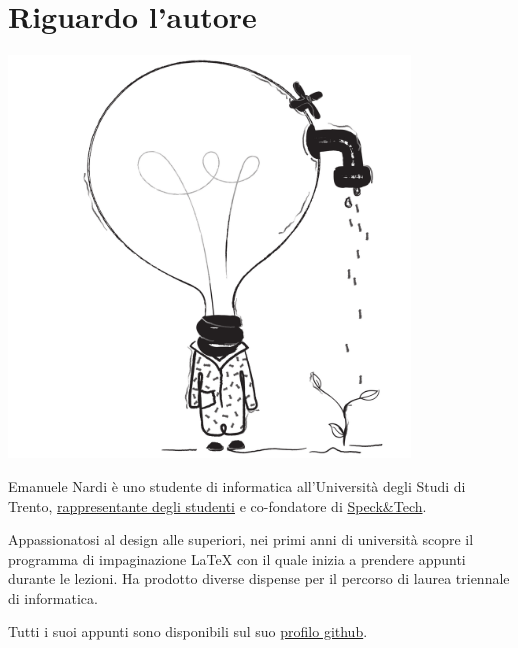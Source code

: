 \section*{Riguardo l'autore}

\begin{minipage}[c]{.5\textwidth}
\centering
	\includegraphics[width=0.8\textwidth]{assets/figures/absurd-08}
\end{minipage}
\begin{minipage}[c]{.5\textwidth}
	Emanuele Nardi è uno studente di informatica all'Università degli Studi di Trento, \href{https://www.facebook.com/rappresentantidisi/}{rappresentante degli studenti} e co-fondatore di \href{http://speckand.tech}{Speck\&Tech}.

	\medskip
	Appassionatosi al design alle superiori, nei primi anni di università scopre il programma di impaginazione {\LaTeX} con il quale inizia a prendere appunti durante le lezioni.
	Ha prodotto diverse dispense per il percorso di laurea triennale di informatica.

	\smallskip
	Tutti i suoi appunti sono disponibili sul suo \href{github.com/emanuelenardi}{profilo  github{\ExternalLink}}.
\end{minipage}
